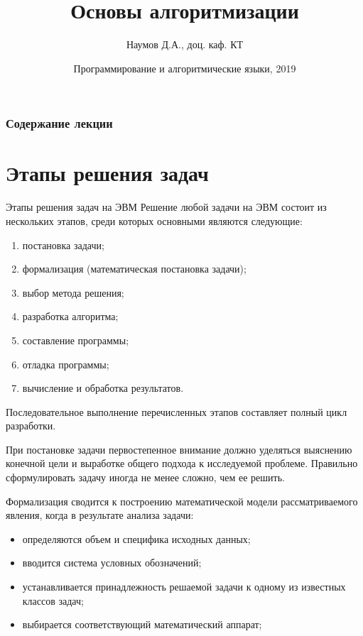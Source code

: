 \documentclass{beamer}
\title[Основы алгоритмизации]{Основы алгоритмизации}
\author{Наумов Д.А., доц. каф. КТ}
\date[11.02.2019] {Программирование и алгоритмические языки, 2019}
\begin{document}
\begin{frame}
  \titlepage
\end{frame}
  
\begin{frame}
  \frametitle{Содержание лекции}
  \tableofcontents  
\end{frame}

\section{Этапы решения задач}
\begin{frame}{Этапы решения задач на ЭВМ}
Решение любой задачи на ЭВМ состоит из нескольких этапов, среди которых основными являются следующие:
\begin{enumerate}
\item постановка задачи;
\item формализация (математическая постановка задачи);
\item выбор метода решения;
\item разработка алгоритма;
\item составление программы;
\item отладка программы;
\item вычисление и обработка результатов.
\end{enumerate}
Последовательное выполнение перечисленных этапов составляет полный цикл разработки.
\end{frame} 

\begin{frame}
\begin{block}{При постановке задачи}
первостепенное внимание должно уделяться выяснению конечной цели и выработке общего подхода к исследуемой проблеме. Правильно сформулировать задачу иногда не менее сложно, чем ее решить.
\end{block}
\begin{block}{Формализация}
сводится к построению математической модели рассматриваемого явления, когда в результате анализа задачи:
\end{block}
\begin{itemize}
\item определяются объем и специфика исходных данных;
\item вводится система условных обозначений;
\item устанавливается принадлежность решаемой задачи к одному из известных классов задач;
\item выбирается соответствующий математический аппарат;
\end{itemize}
\end{frame}
\end{document}
